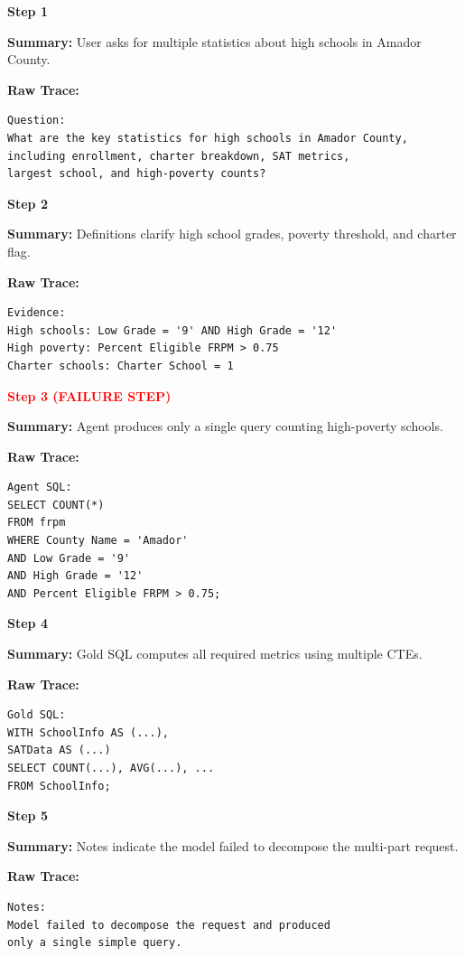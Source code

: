 \documentclass[11pt]{article}
\begin{document}
\begin{tcolorbox}[
breakable,
colback=customwhite,
colframe=customred,
title=Planning Error,
fontupper=\fontfamily{pcr}\selectfont\scriptsize
]

\textbf{Step 1}

\textbf{Summary:}  
User asks for multiple statistics about high schools in Amador County.

\textbf{Raw Trace:}
\begin{verbatim}
Question:
What are the key statistics for high schools in Amador County,
including enrollment, charter breakdown, SAT metrics,
largest school, and high-poverty counts?
\end{verbatim}

\medskip
\textbf{Step 2}

\textbf{Summary:}  
Definitions clarify high school grades, poverty threshold, and charter flag.

\textbf{Raw Trace:}
\begin{verbatim}
Evidence:
High schools: Low Grade = '9' AND High Grade = '12'
High poverty: Percent Eligible FRPM > 0.75
Charter schools: Charter School = 1
\end{verbatim}

\medskip
\textbf{\textcolor{red}{Step 3 (FAILURE STEP)}}

\textbf{Summary:}  
Agent produces only a single query counting high-poverty schools.

\textbf{Raw Trace:}
\begin{verbatim}
Agent SQL:
SELECT COUNT(*)
FROM frpm
WHERE County Name = 'Amador'
AND Low Grade = '9'
AND High Grade = '12'
AND Percent Eligible FRPM > 0.75;
\end{verbatim}

\medskip
\textbf{Step 4}

\textbf{Summary:}  
Gold SQL computes all required metrics using multiple CTEs.

\textbf{Raw Trace:}
\begin{verbatim}
Gold SQL:
WITH SchoolInfo AS (...),
SATData AS (...)
SELECT COUNT(...), AVG(...), ...
FROM SchoolInfo;
\end{verbatim}

\medskip
\textbf{Step 5}

\textbf{Summary:}  
Notes indicate the model failed to decompose the multi-part request.

\textbf{Raw Trace:}
\begin{verbatim}
Notes:
Model failed to decompose the request and produced
only a single simple query.
\end{verbatim}

\end{tcolorbox}
\end{document}
